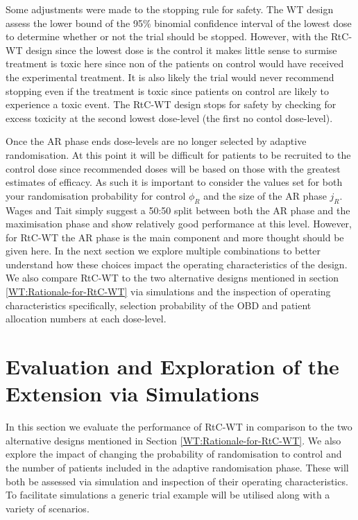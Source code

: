 Some adjustments were made to the stopping rule for safety. The WT design assess the lower bound of the 95\% binomial confidence interval of the lowest dose to determine whether or not the trial should be stopped. However, with the RtC-WT design since the lowest dose is the control it makes little sense to surmise treatment is toxic here since non of the patients on control would have received the experimental treatment. It is also likely the trial would never recommend stopping even if the treatment is toxic since patients on control are likely to experience a toxic event. The RtC-WT design stops for safety by checking for excess toxicity at the second lowest dose-level (the first no contol dose-level). 

Once the AR phase ends dose-levels are no longer selected by adaptive randomisation. At this point it will be difficult for patients to be recruited to the control dose since recommended doses will be based on those with the greatest estimates of efficacy. As such it is important to consider the values set for both your randomisation probability for control $\phi_R$ and the size of the AR phase $j_R$. Wages and Tait simply suggest a 50:50 split between both the AR phase and the maximisation phase and show relatively good performance at this level. However, for RtC-WT the AR phase is the main component and more thought should be given here. In the next section we explore multiple combinations to better understand how these choices impact the operating characteristics of the design. We also compare RtC-WT to the two alternative designs mentioned in section  \ref{WT:Rationale-for-RtC-WT} via simulations and the inspection of operating characteristics specifically, selection probability of the OBD and patient allocation numbers at each dose-level. 
 
 
 \section{Evaluation and Exploration of the Extension via Simulations}
 \label{WT:Evaluation-of-the-Extension}
 
 In this section we evaluate the performance of RtC-WT in comparison to the two alternative designs mentioned in Section \ref{WT:Rationale-for-RtC-WT}. We also explore the impact of changing the probability of randomisation to control and the number of patients included in the adaptive randomisation phase. These will both be assessed via simulation and inspection of their operating characteristics. To facilitate simulations a generic trial example will be utilised along with a variety of scenarios. 
 
